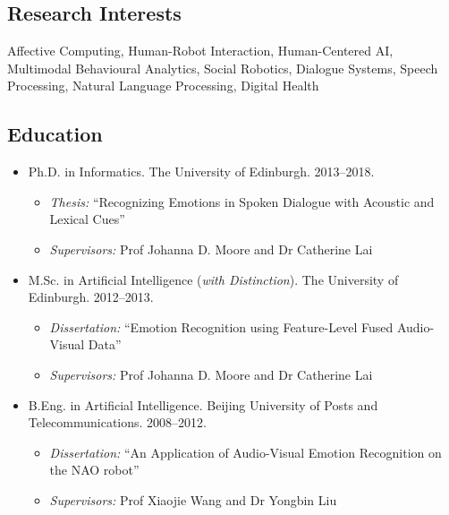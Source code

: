 \documentclass[11pt,letterpaper]{article}
\begin{document}
\smallskip

\subsection*{Research Interests}
Affective Computing, Human-Robot Interaction, Human-Centered AI, Multimodal Behavioural Analytics, Social Robotics, Dialogue Systems, Speech Processing, Natural Language Processing, Digital Health

\subsection*{Education}
\begin{itemize}
  \item Ph.D. in Informatics. The University of Edinburgh. 2013--2018.
  \begin{itemize}
    \item \emph{Thesis:} ``Recognizing Emotions in Spoken Dialogue with Acoustic and Lexical Cues''
    \item \emph{Supervisors:} Prof Johanna D. Moore and Dr Catherine Lai
  \end{itemize}
  \item M.Sc. in Artificial Intelligence (\emph{with Distinction}). The University of Edinburgh. 2012--2013.
  \begin{itemize}
    \item \emph{Dissertation:} ``Emotion Recognition using Feature-Level Fused Audio-Visual Data''
    \item \emph{Supervisors:} Prof Johanna D. Moore and Dr Catherine Lai
  \end{itemize}
  \item B.Eng. in Artificial Intelligence. Beijing University of Posts and Telecommunications. 2008--2012.
  \begin{itemize}
    \item \emph{Dissertation:} ``An Application of Audio-Visual Emotion Recognition on the NAO robot''
    \item \emph{Supervisors:} Prof Xiaojie Wang and Dr Yongbin Liu
  \end{itemize}
\end{itemize}
\end{document}
